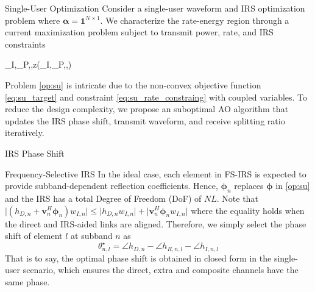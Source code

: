 \documentclass{IEEEtran}
\begin{document}
\begin{section}{Single-User Optimization}
	Consider a single-user waveform and IRS optimization problem where $\boldsymbol{\alpha}=\boldsymbol{1}^{N \times 1}$. We characterize the rate-energy region through a current maximization problem subject to transmit power, rate, and IRS constraints
	\begin{maxi!}
			{\boldsymbol{w}_I,_P,\boldsymbol{\phi},\rho}{z(\boldsymbol{w}_I,_P,\boldsymbol{\phi},\rho)}{\label{op:su}}{\label{eq:su_target}}
			\label{eq:su_rate_constraing}
		\end{maxi!}
	Problem \ref{op:su} is intricate due to the non-convex objective function \ref{eq:su_target} and constraint \ref{eq:su_rate_constraing} with coupled variables. To reduce the design complexity, we propose an suboptimal AO algorithm that updates the IRS phase shift, transmit waveform, and receive splitting ratio iteratively.

	\begin{subsection}{IRS Phase Shift}
		\begin{subsubsection}{Frequency-Selective IRS}\label{se:fs_irs}
			In the ideal case, each element in FS-IRS is expected to provide subband-dependent reflection coefficients. Hence, $\boldsymbol{\phi}_n$ replaces $\boldsymbol{\phi}$ in \ref{op:su} and the IRS has a total Degree of Freedom (DoF) of $NL$. Note that $\lvert{(h_{D,n}+\boldsymbol{v}_n^H\boldsymbol{\phi}_n)w_{I,n}}\rvert \le \lvert{h_{D,n}w_{I,n}}\rvert+\lvert{\boldsymbol{v}_n^H\boldsymbol{\phi}_n w_{I,n}}\rvert$ where the equality holds when the direct and IRS-aided links are aligned. Therefore, we simply select the phase shift of element $l$ at subband $n$ as
			\begin{equation}\label{eq:theta}
				\theta_{n,l}^\star = \angle{h}_{D,n} - \angle{h_{R,n,l}}-\angle{h_{I,n,l}}
			\end{equation}
			That is to say, the optimal phase shift is obtained in closed form in the single-user scenario, which ensures the direct, extra and composite channels have the same phase.
		\end{subsubsection}


\end{subsection}
\end{section}
\end{document}
